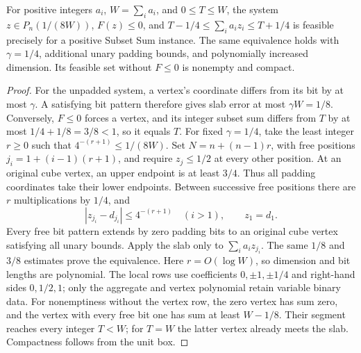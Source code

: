 \begin{lemma}\label{lem:klee-padding}
For positive integers \(a_i\), \(W=\sum_i a_i\), and \(0\le T\le W\), the
system \(z\in P_n(1/(8W))\), \(F(z)\le0\), and
\(T-1/4\le\sum_i a_i z_i\le T+1/4\) is feasible precisely for a positive
Subset Sum instance. The same equivalence holds with \(\gamma=1/4\), additional
unary padding bounds, and polynomially increased dimension. Its feasible set
without \(F\le0\) is nonempty and compact.
\end{lemma}
\begin{proof}
For the unpadded system, a vertex's coordinate differs from its bit by at most
\(\gamma\). A satisfying bit pattern therefore gives slab error at most
\(\gamma W=1/8\). Conversely, \(F\le0\) forces a vertex, and its integer
subset sum differs from \(T\) by at most \(1/4+1/8=3/8<1\), so it equals
\(T\).
For fixed \(\gamma=1/4\), take the least integer \(r\ge0\) such that
\(4^{-(r+1)}\le1/(8W)\). Set \(N=n+(n-1)r\), with free positions
\(j_i=1+(i-1)(r+1)\), and require \(z_j\le1/2\) at every other position.
At an original cube vertex, an upper endpoint is at least \(3/4\). Thus all
padding coordinates take their lower endpoints. Between successive free
positions there are \(r\) multiplications by \(1/4\), and
\[
 |z_{j_i}-d_{j_i}|\le4^{-(r+1)}\quad(i>1),\qquad z_1=d_1.
\]
Every free bit pattern extends by zero padding bits to an original cube
vertex satisfying all unary bounds. Apply the slab only to
\(\sum_i a_i z_{j_i}\). The same \(1/8\) and \(3/8\) estimates prove the
equivalence. Here \(r=O(\log W)\), so dimension and bit lengths are polynomial.
The local rows use coefficients \(0,\pm1,\pm1/4\) and right-hand sides
\(0,1/2,1\); only the aggregate and vertex polynomial retain variable binary
data. For nonemptiness without the vertex row, the zero vertex has sum zero,
and the vertex with every free bit one has sum at least \(W-1/8\).
Their segment reaches every integer \(T<W\); for \(T=W\) the latter vertex
already meets the slab. Compactness follows from the unit box.
\end{proof}

